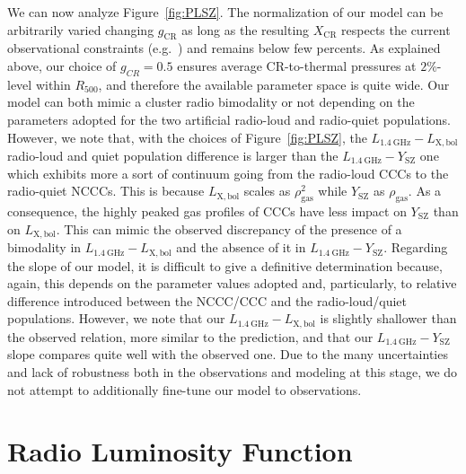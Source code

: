 \documentclass[traditabstract]{aa}
\newcommand{\rmn}{\mathrm}
\begin{document}
We can now analyze Figure~\ref{fig:PLSZ}. The normalization of our model can be arbitrarily varied changing $g_{\rmn{CR}}$ as long as the resulting $X_{\rmn{CR}}$ respects the current observational constraints (e.g.~\citealp{2011arXiv1111.5544M}) and remains below few percents. As explained above, our choice of $g_{CR}=0.5$ ensures average CR-to-thermal pressures at $2\%$-level within $R_{500}$, and therefore the available parameter space is quite wide. Our model can both mimic a cluster radio bimodality or not depending on the parameters adopted for the two artificial radio-loud and radio-quiet populations. However, we note that, with the choices of Figure~\ref{fig:PLSZ}, the $L_{1.4~\rmn{GHz}}-L_{\rmn{X,bol}}$ radio-loud and quiet population difference is larger than the $L_{1.4~\rmn{GHz}}-Y_{\rmn{SZ}}$ one which exhibits more a sort of continuum going from the radio-loud CCCs to the radio-quiet NCCCs. This is because $L_{\rmn{X,bol}}$ scales as $\rho_{\rmn{gas}}^2$ while $Y_{\rmn{SZ}}$ as $\rho_{\rmn{gas}}$. As a consequence, the highly peaked gas profiles of CCCs have less impact on $Y_{\rmn{SZ}}$ than on  $L_{\rmn{X,bol}}$. This can mimic the observed discrepancy of the presence of a bimodality in $L_{1.4~\rmn{GHz}}-L_{\rmn{X,bol}}$ and the absence of it in $L_{1.4~\rmn{GHz}}-Y_{\rmn{SZ}}$. Regarding the slope of our model, it is difficult to give a definitive determination because, again, this depends on the parameter values adopted and, particularly, to relative difference introduced between the NCCC/CCC and the radio-loud/quiet populations. However, we note that our $L_{1.4~\rmn{GHz}}-L_{\rmn{X,bol}}$ is slightly shallower than the observed relation, more similar to the \cite{2009JCAP...09..024K} prediction, and that our $L_{1.4~\rmn{GHz}}-Y_{\rmn{SZ}}$ slope compares quite well with the observed one. Due to the many uncertainties and lack of robustness both in the observations and modeling at this stage, we do not attempt to additionally fine-tune our model to observations. 


\section{Radio Luminosity Function}
\label{sec:5}
\end{document}
